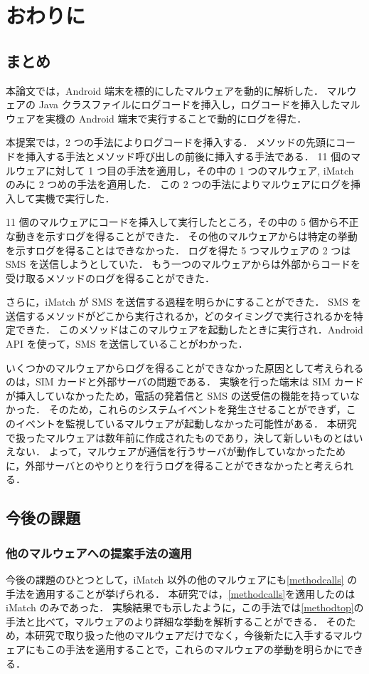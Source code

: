 \section{おわりに}
\label{sec:concl}
\subsection{まとめ}
本論文では，Android 端末を標的にしたマルウェアを動的に解析した．
マルウェアの Java クラスファイルにログコードを挿入し，ログコードを挿入したマルウェアを実機の Android 端末で実行することで動的にログを得た．

本提案では，2 つの手法によりログコードを挿入する．
メソッドの先頭にコードを挿入する手法とメソッド呼び出しの前後に挿入する手法である．
11 個のマルウェアに対して 1 つ目の手法を適用し，その中の 1 つのマルウェア, iMatch のみに 2 つめの手法を適用した．
この 2 つの手法によりマルウェアにログを挿入して実機で実行した．

11 個のマルウェアにコードを挿入して実行したところ，その中の 5 個から不正な動きを示すログを得ることができた．
その他のマルウェアからは特定の挙動を示すログを得ることはできなかった．
ログを得た 5 つマルウェアの 2 つは SMS を送信しようとしていた．
もう一つのマルウェアからは外部からコードを受け取るメソッドのログを得ることができた．

さらに，iMatch が SMS を送信する過程を明らかにすることができた．
SMS を送信するメソッドがどこから実行されるか，どのタイミングで実行されるかを特定できた．
このメソッドはこのマルウェアを起動したときに実行され．Android API を使って，SMS を送信していることがわかった．

いくつかのマルウェアからログを得ることができなかった原因として考えられるのは，SIM カードと外部サーバの問題である．
実験を行った端末は SIM カードが挿入していなかったため，電話の発着信と SMS の送受信の機能を持っていなかった．
そのため，これらのシステムイベントを発生させることができず，このイベントを監視しているマルウェアが起動しなかった可能性がある．
本研究で扱ったマルウェアは数年前に作成されたものであり，決して新しいものとはいえない．
よって，マルウェアが通信を行うサーバが動作していなかったために，外部サーバとのやりとりを行うログを得ることができなかったと考えられる．

\subsection{今後の課題}
\subsubsection{他のマルウェアへの提案手法の適用}
今後の課題のひとつとして，iMatch 以外の他のマルウェアにも\ref{methodcalls} の手法を適用することが挙げられる．
本研究では，\ref{methodcalls}を適用したのは iMatch のみであった．
実験結果でも示したように，この手法では\ref{methodtop}の手法と比べて，マルウェアのより詳細な挙動を解析することができる．
そのため，本研究で取り扱った他のマルウェアだけでなく，今後新たに入手するマルウェアにもこの手法を適用することで，これらのマルウェアの挙動を明らかにできる．

